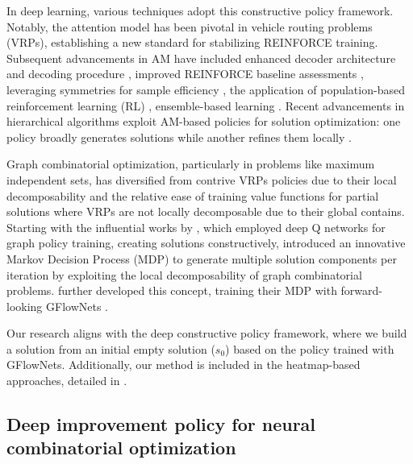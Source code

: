 \documentclass[twoside]{article}
\theoremstyle{plain}
\theoremstyle{definition}
\theoremstyle{remark}
\begin{document}
In deep learning, various techniques adopt this constructive policy framework. Notably, the attention model \citep[AM;][]{kool2018attention} has been pivotal in vehicle routing problems (VRPs), establishing a new standard for stabilizing REINFORCE training. Subsequent advancements in AM have included enhanced decoder architecture and decoding procedure \citep{son2023solving, xin2021multi,luo2023neural,drakulic2023bq}, improved REINFORCE \citep{williams1992simple} baseline assessments \citep{kwon2020pomo, kim2022sym}, leveraging symmetries for sample efficiency \citep{kim2023enhancing}, the application of population-based reinforcement learning (RL) \citep{grinsztajn2022poppy}, ensemble-based learning \citep{jiang2023ensemblebased, zhou2024mvmoe}. Recent advancements in hierarchical algorithms exploit AM-based policies for solution optimization: one policy broadly generates solutions while another refines them locally \citep{kim2021learning,hou2022generalize,ye2024glop, zheng2024udc}.


Graph combinatorial optimization, particularly in problems like maximum independent sets, has diversified from contrive VRPs policies due to their local decomposability and the relative ease of training value functions for partial solutions where VRPs are not locally decomposable due to their global contains. Starting with the influential works by \citet{khalil2017learning}, which employed deep Q networks \citep{mnih2013playing} for graph policy training, creating solutions constructively, \citet{ahn2020learning} introduced an innovative Markov Decision Process (MDP) to generate multiple solution components per iteration by exploiting the local decomposability of graph combinatorial problems. \citet{zhang2023let} further developed this concept, training their MDP with forward-looking GFlowNets \citep{pan2023better}.

Our research aligns with the deep constructive policy framework, where we build a solution from an initial empty solution ($s_0$) based on the policy trained with GFlowNets. Additionally, our method is included in the heatmap-based approaches, detailed in .




\subsection{Deep improvement policy for neural combinatorial optimization}
\end{document}
